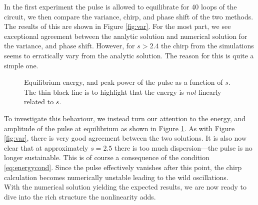 In the first experiment the pulse is allowed to equilibrate for 40 loops of the circuit, we then compare the variance, chirp, and phase shift of the two methods. The results of this are shown in Figure \ref{fig:var}. For the most part, we see exceptional agreement between the analytic solution and numerical solution for the variance, and phase shift. However, for $s > 2.4$ the chirp from the simulations seems to erratically vary from the analytic solution. The reason for this is quite a simple one. \\
\begin{figure}[tbp]
\centering

\caption{Equilibrium energy, and peak power of the pulse as a function of $s$. The thin black line is to highlight that the energy is \emph{not} linearly related to $s$.}
\label{fig:valenergy}
\end{figure}

To investigate this behaviour, we instead turn our attention to the energy, and amplitude of the pulse at equilibrium as shown in Figure \ref{fig:valenergy}. As with Figure \ref{fig:var}, there is very good agreement between the two solutions. It is also now clear that at approximately $s = 2.5$ there is too much dispersion---the pulse is no longer sustainable. This is of course a consequence of the condition \eqref{eq:energycond}. Since the pulse effectively vanishes after this point, the chirp calculation becomes numerically unstable leading to the wild oscillations. \\

With the numerical solution yielding the expected results, we are now ready to dive into the rich structure the nonlinearity adds.

